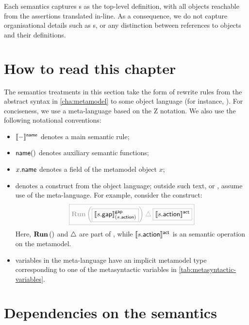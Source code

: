 Each semantics captures \massertion s as the top-level definition, with all
objects reachable from the assertions translated in-line.  As a
consequence, we do not capture organisational details such as \mrapackage s,
or any distinction between references to objects and their definitions.

\section{How to read this chapter}



The semantics treatments in this section take the form of rewrite rules from
the abstract syntax in \cref{cha:metamodel} to some object language (for
instance, \tockcsp).
For conciseness, we use a meta-language based on the Z notation.
We also use the following notational conventions:

\begin{itemize}
\item
	\(\llbracket - \rrbracket^{\mathsf{name}}\) denotes a main semantic rule;
\item
	\(\mathsf{name}()\) denotes auxiliary semantic functions;
\item
	\(x.\mathsf{name}\) denotes a field of the metamodel object \(x\);
\item
	 denotes a construct from the object
	language; outside such text, or ,
	assume use of the meta-language.  For example, consider the \tockcsp{}
	construct:
	\[\tlang{
		\runproc{\olang{\gapsema{\field{\astep}{gap}}{\field{\astep}{action}}}}
		\interrupt \olang{\actsema{\field{\astep}{action}}}
	}\]
	Here, \(\operatorname{\mathbf{Run}}\left(\right)\) and \(\mathbin{\triangle}\) are part of \tockcsp, while
	\(\llbracket s.\mathsf{action} \rrbracket^{\mathsf{act}}\) is an semantic operation on the
	\langname{} metamodel.
\item
	variables in the meta-language have an implicit metamodel type
	corresponding to one of the metasyntactic variables in
	\cref{tab:metasyntactic-variables}.
\end{itemize}

\section{Dependencies on the \robochart{} semantics}

\newcommand{\targetProcess}[1]{\ensuremath{\funcname{targetProcess}\left(#1\right)}}
\newcommand{\targetParams}[1]{\ensuremath{\funcname{targetParams}\left(#1\right)}}
\newcommand{\constName}[1]{\ensuremath{\funcname{constName}\left(#1\right)}}

